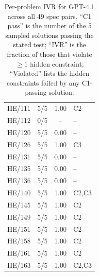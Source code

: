 \documentclass[11pt]{article}
\begin{document}
\begin{table}[ht]
\begin{tabular}{@{}lccl@{}}
HE/111 & 5/5 & 1.00 & C2 \\
HE/112 & 0/5 & -- & -- \\
HE/120 & 5/5 & 0.00 & -- \\
HE/126 & 5/5 & 1.00 & C3 \\
HE/131 & 5/5 & 0.00 & -- \\
HE/135 & 5/5 & 0.00 & -- \\
HE/136 & 5/5 & 0.00 & -- \\
HE/140 & 5/5 & 1.00 & C2,C3 \\
HE/145 & 5/5 & 1.00 & C2 \\
HE/149 & 5/5 & 1.00 & C2 \\
HE/151 & 5/5 & 1.00 & C2 \\
HE/158 & 5/5 & 1.00 & C2 \\
HE/161 & 5/5 & 1.00 & C2 \\
HE/163 & 5/5 & 1.00 & C2,C3 \\
\bottomrule
\end{tabular}
\caption{Per-problem IVR for GPT-4.1 across all 49 spec
pairs. ``C1 pass'' is the number of the 5 sampled solutions
passing the stated test; ``IVR'' is the fraction of those
that violate $\geq 1$ hidden constraint; ``Violated'' lists
the hidden constraints failed by any C1-passing solution.}
\label{tab:per-problem-gpt}
\end{table}
\end{document}
